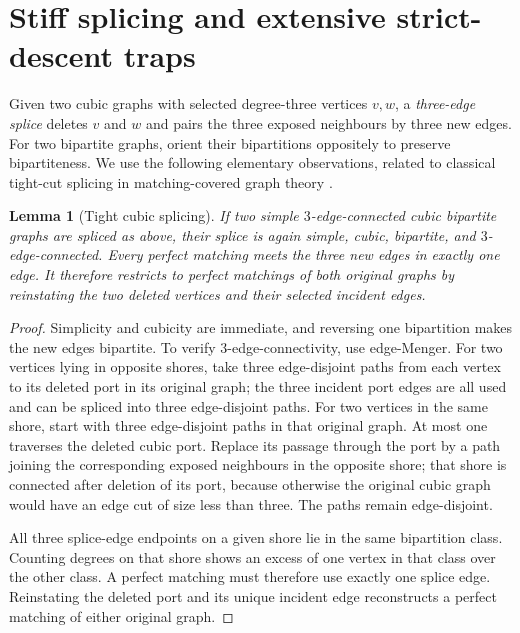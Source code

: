 \documentclass[11pt]{article}
\newtheorem{lemma}[theorem]{Lemma}
\begin{document}
\section{Stiff splicing and extensive strict-descent traps}
Given two cubic graphs with selected degree-three vertices $v,w$, a \emph{three-edge splice} deletes $v$ and $w$ and pairs the three exposed neighbours by three new edges. For two bipartite graphs, orient their bipartitions oppositely to preserve bipartiteness. We use the following elementary observations, related to classical tight-cut splicing in matching-covered graph theory \cite{LovaszPlummer,LuKothari2020}.

\begin{lemma}[Tight cubic splicing]\label{lem:cut}
If two simple $3$-edge-connected cubic bipartite graphs are spliced as above, their splice is again simple, cubic, bipartite, and $3$-edge-connected. Every perfect matching meets the three new edges in exactly one edge. It therefore restricts to perfect matchings of both original graphs by reinstating the two deleted vertices and their selected incident edges.
\end{lemma}
\begin{proof}
Simplicity and cubicity are immediate, and reversing one bipartition makes the new edges bipartite. To verify $3$-edge-connectivity, use edge-Menger. For two vertices lying in opposite shores, take three edge-disjoint paths from each vertex to its deleted port in its original graph; the three incident port edges are all used and can be spliced into three edge-disjoint paths. For two vertices in the same shore, start with three edge-disjoint paths in that original graph. At most one traverses the deleted cubic port. Replace its passage through the port by a path joining the corresponding exposed neighbours in the opposite shore; that shore is connected after deletion of its port, because otherwise the original cubic graph would have an edge cut of size less than three. The paths remain edge-disjoint.

All three splice-edge endpoints on a given shore lie in the same bipartition class. Counting degrees on that shore shows an excess of one vertex in that class over the other class. A perfect matching must therefore use exactly one splice edge. Reinstating the deleted port and its unique incident edge reconstructs a perfect matching of either original graph.
\end{proof}
\end{document}
